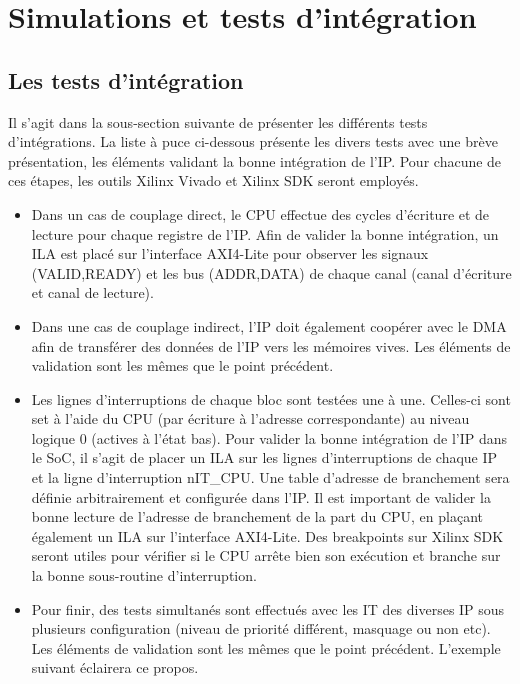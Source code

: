 \section{Simulations et tests d'intégration}

\subsection{Les tests d'intégration}

Il s'agit dans la sous-section suivante de présenter les différents tests d'intégrations.
La liste à puce ci-dessous présente les divers tests avec une brève présentation, les éléments validant la bonne intégration de l'IP.
Pour chacune de ces étapes, les outils Xilinx Vivado et Xilinx SDK seront employés.

\begin{itemize}
	\item Dans un cas de couplage direct, le CPU effectue des cycles d'écriture et de lecture pour chaque registre de l'IP.
	Afin de valider la bonne intégration, un ILA est placé sur l'interface AXI4-Lite pour observer les signaux (VALID,READY) et les bus (ADDR,DATA) de chaque canal (canal d'écriture et canal de lecture).
	\item Dans une cas de couplage indirect, l'IP doit également coopérer avec le DMA afin de transférer des données de l'IP vers les mémoires vives.
	Les éléments de validation sont les mêmes que le point précédent.
	\item Les lignes d'interruptions de chaque bloc sont testées une à une.
	Celles-ci sont set à l'aide du CPU (par écriture à l'adresse correspondante) au niveau logique 0 (actives à l'état bas).
	Pour valider la bonne intégration de l'IP dans le SoC, il s'agit de placer un ILA sur les lignes d'interruptions de chaque IP et la ligne d'interruption nIT\_CPU.
	Une table d'adresse de branchement sera définie arbitrairement et configurée dans l'IP.
	Il est important de valider la bonne lecture de l'adresse de branchement de la part du CPU, en plaçant également un ILA sur l'interface AXI4-Lite.
	Des breakpoints sur Xilinx SDK seront utiles pour vérifier si le CPU arrête bien son exécution et branche sur la bonne sous-routine d'interruption.
	\item Pour finir, des tests simultanés sont effectués avec les IT des diverses IP sous plusieurs configuration (niveau de priorité différent, masquage ou non etc).
	Les éléments de validation sont les mêmes que le point précédent.
	L'exemple suivant éclairera ce propos. 
	
\end{itemize}

